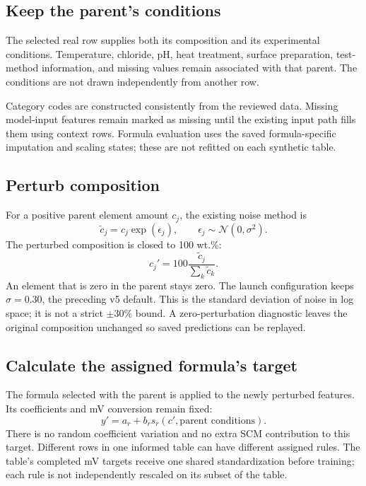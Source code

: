 \documentclass[11pt]{article}
\begin{document}
\subsection{Keep the parent's conditions}
The selected real row supplies both its composition and its experimental
conditions. Temperature, chloride, pH, heat treatment, surface preparation,
test-method information, and missing values remain associated with that parent.
The conditions are not drawn independently from another row.

Category codes are constructed consistently from the reviewed data. Missing
model-input features remain marked as missing until the existing input path
fills them using context rows. Formula evaluation uses the saved formula-specific
imputation and scaling states; these are not refitted on each synthetic table.

\subsection{Perturb composition}
For a positive parent element amount $c_j$, the existing noise method is
\begin{equation}
 \widetilde c_j=c_j\exp(\epsilon_j),\qquad
 \epsilon_j\sim\mathcal{N}(0,\sigma^2).
\end{equation}
The perturbed composition is closed to 100 wt.\%:
\begin{equation}
 c_j'=100\frac{\widetilde c_j}{\sum_k\widetilde c_k}.
\end{equation}
An element that is zero in the parent stays zero. The launch configuration keeps
$\sigma=0.30$, the preceding v5 default. This is the standard deviation of noise
in log space; it is not a strict $\pm30\%$ bound. A zero-perturbation diagnostic
leaves the original composition unchanged so saved predictions can be replayed.

\subsection{Calculate the assigned formula's target}
The formula selected with the parent is applied to the newly perturbed features.
Its coefficients and mV conversion remain fixed:
\begin{equation}
 y'=a_r+b_r s_r(c',\text{parent conditions}).
\end{equation}
There is no random coefficient variation and no extra SCM contribution to this
target. Different rows in one informed table can have different assigned rules.
The table's completed mV targets receive one shared standardization before
training; each rule is not independently rescaled on its subset of the table.
\end{document}
